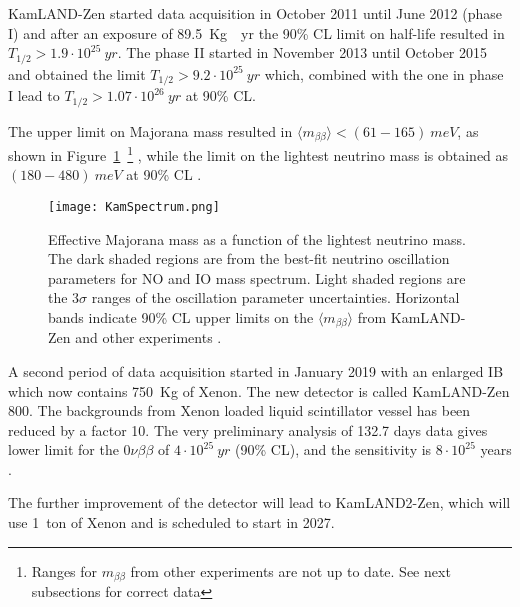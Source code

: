 \documentclass{subnucbo}
\begin{document}
KamLAND-Zen started data acquisition in October 2011 until June 2012 (phase I) and after an exposure of \SI{89.5}{Kg\cdot yr} the 90\% CL limit on half-life resulted in $T_{1/2}>1.9\cdot10^{25}\SI{}{yr}$.
The phase II started in November 2013 until October 2015 and obtained the limit  $T_{1/2}>9.2\cdot10^{25}\SI{}{yr}$ which, combined with the one in phase I lead to  $T_{1/2}>1.07\cdot10^{26}\SI{}{yr}$ at 90\% CL.

The upper limit on Majorana mass resulted in $\langle m_{\beta\beta}\rangle<(61-165)\SI{}{meV}$, as shown in  Figure~\ref{fig:kamSpec}~\footnote{Ranges for $m_{\beta\beta}$ from other experiments are not up to date. See next subsections for correct data} , while the limit on the lightest neutrino mass is obtained as $(180-480)\SI{}{meV}$ at 90\% CL \cite{ref:kam}.
\begin{figure}
\centering
\texttt{[image: KamSpectrum.png]}
\caption{Effective Majorana mass as a function of the lightest neutrino mass. The dark shaded regions are from the best-fit neutrino oscillation parameters for NO and IO mass spectrum. Light shaded regions are the $3\sigma$ ranges of the oscillation parameter uncertainties. Horizontal bands indicate 90\% CL upper limits on the $\langle m_{\beta\beta}\rangle$ from KamLAND-Zen and other experiments \cite{ref:kam}.} 
\label{fig:kamSpec}
\end{figure}

A second period of data acquisition started in January 2019 with an enlarged IB which now contains \SI{750}{Kg} of Xenon. The new detector is called KamLAND-Zen 800.
The backgrounds from Xenon loaded liquid scintillator vessel has been reduced by a factor 10. The very preliminary analysis of 132.7 days data gives lower limit for the $0\nu\beta\beta$ of $4\cdot 10^{25}\SI{}{yr}$ (90\% CL), and the sensitivity is $8\cdot 10^{25}$ years \cite{ref:kam800}. 

The further improvement of the detector will lead to KamLAND2-Zen, which will use \SI{1}{ton} of Xenon and is scheduled to start in 2027.
\end{document}
